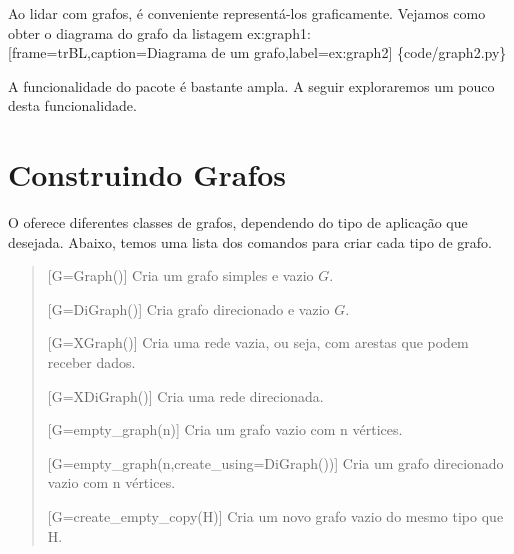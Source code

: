\documentclass[a4paper,10pt,portuguese]{sphinxmanual}
\begin{document}
Ao lidar com grafos, é conveniente representá-los graficamente.
Vejamos como obter o diagrama do grafo da listagem ex:graph1:
{[}frame=trBL,caption=Diagrama de um grafo,label=ex:graph2{]} \{code/graph2.py\}

A funcionalidade do pacote  é bastante ampla. A seguir
exploraremos um pouco desta funcionalidade.


\section{Construindo Grafos}
\label{capgraph:construindo-grafos}
O  oferece diferentes classes de grafos, dependendo do
tipo de aplicação que desejada. Abaixo, temos uma lista dos
comandos para criar cada tipo de grafo.
\begin{quote}

{[}G=Graph(){]} Cria um grafo simples e vazio $G$.

{[}G=DiGraph(){]} Cria grafo direcionado e vazio $G$.

{[}G=XGraph(){]} Cria uma rede vazia, ou seja, com arestas que podem
receber dados.

{[}G=XDiGraph(){]} Cria uma rede direcionada.

{[}G=empty\_graph(n){]} Cria um grafo vazio com n vértices.

{[}G=empty\_graph(n,create\_using=DiGraph()){]} Cria um grafo
direcionado vazio com n vértices.

{[}G=create\_empty\_copy(H){]} Cria um novo grafo vazio do mesmo tipo
que H.
\end{quote}
\end{document}
